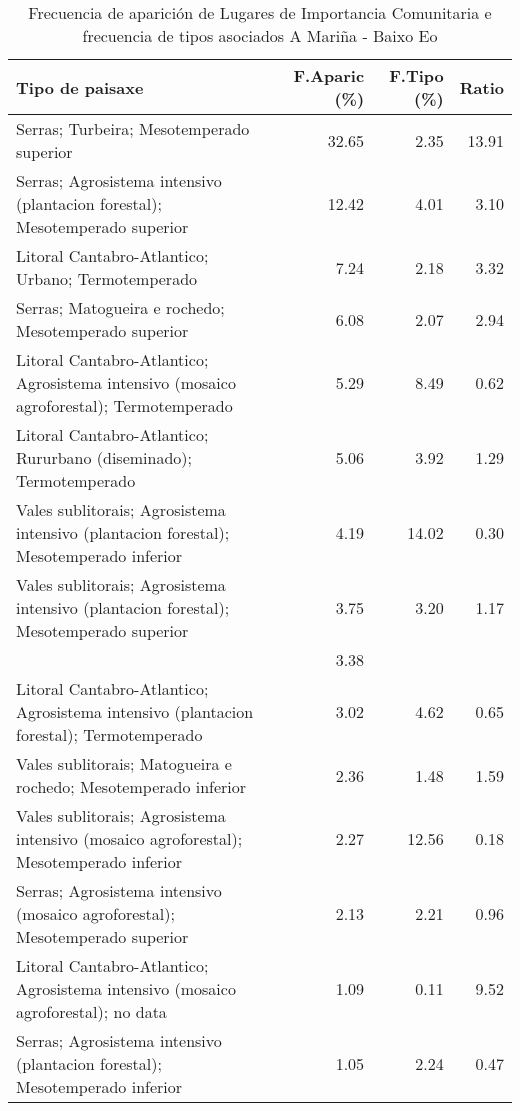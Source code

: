 \begin{table}[p]
\centering
\caption{Frecuencia de aparición de Lugares de Importancia Comunitaria e frecuencia de tipos asociados A Mariña - Baixo Eo} 
\label{vnatura2}
\begin{tabular}{lrrr}
  \hline
Tipo de paisaxe & F.Aparic (\%) & F.Tipo (\%) & Ratio \\ 
  \hline
Serras; Turbeira; Mesotemperado superior & 32.65 & 2.35 & 13.91 \\ 
  Serras; Agrosistema intensivo (plantacion forestal); Mesotemperado superior & 12.42 & 4.01 & 3.10 \\ 
  Litoral Cantabro-Atlantico; Urbano; Termotemperado & 7.24 & 2.18 & 3.32 \\ 
  Serras; Matogueira e rochedo; Mesotemperado superior & 6.08 & 2.07 & 2.94 \\ 
  Litoral Cantabro-Atlantico; Agrosistema intensivo (mosaico agroforestal); Termotemperado & 5.29 & 8.49 & 0.62 \\ 
  Litoral Cantabro-Atlantico; Rururbano (diseminado); Termotemperado & 5.06 & 3.92 & 1.29 \\ 
  Vales sublitorais; Agrosistema intensivo (plantacion forestal); Mesotemperado inferior & 4.19 & 14.02 & 0.30 \\ 
  Vales sublitorais; Agrosistema intensivo (plantacion forestal); Mesotemperado superior & 3.75 & 3.20 & 1.17 \\ 
   & 3.38 &  &  \\ 
  Litoral Cantabro-Atlantico; Agrosistema intensivo (plantacion forestal); Termotemperado & 3.02 & 4.62 & 0.65 \\ 
  Vales sublitorais; Matogueira e rochedo; Mesotemperado inferior & 2.36 & 1.48 & 1.59 \\ 
  Vales sublitorais; Agrosistema intensivo (mosaico agroforestal); Mesotemperado inferior & 2.27 & 12.56 & 0.18 \\ 
  Serras; Agrosistema intensivo (mosaico agroforestal); Mesotemperado superior & 2.13 & 2.21 & 0.96 \\ 
  Litoral Cantabro-Atlantico; Agrosistema intensivo (mosaico agroforestal); no data & 1.09 & 0.11 & 9.52 \\ 
  Serras; Agrosistema intensivo (plantacion forestal); Mesotemperado inferior & 1.05 & 2.24 & 0.47 \\ 
   \hline
\end{tabular}
\end{table}
